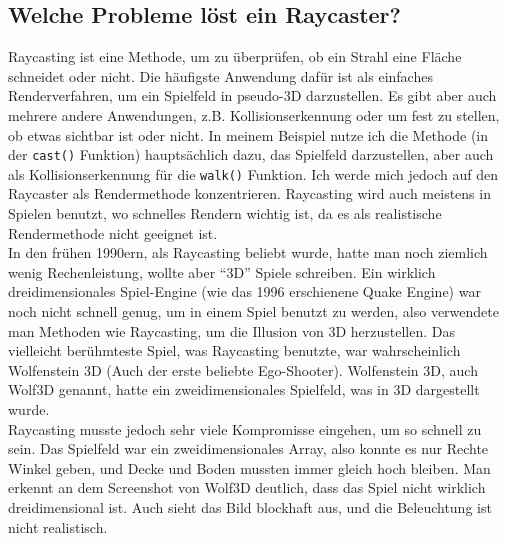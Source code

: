 \documentclass[a4paper,11pt]{report}
\begin{document}
\subsection{Welche Probleme löst ein Raycaster?}
Raycasting ist eine Methode, um zu überprüfen, ob ein Strahl eine Fläche schneidet oder nicht. Die häufigste Anwendung dafür ist als einfaches Renderverfahren, um ein Spielfeld in pseudo-3D darzustellen. Es gibt aber auch mehrere andere Anwendungen, z.B. Kollisionserkennung oder um fest zu stellen, ob etwas sichtbar ist oder nicht. In meinem Beispiel nutze ich die Methode (in der \texttt{cast()} Funktion) hauptsächlich dazu, das Spielfeld darzustellen, aber auch als Kollisionserkennung für die \texttt{walk()} Funktion. Ich werde mich jedoch auf den Raycaster als Rendermethode konzentrieren. Raycasting wird auch meistens in Spielen benutzt, wo schnelles Rendern wichtig ist, da es als realistische Rendermethode nicht geeignet ist. \\
In den frühen 1990ern, als Raycasting beliebt wurde, hatte man noch ziemlich wenig Rechenleistung, wollte aber ``3D'' Spiele schreiben. Ein wirklich dreidimensionales Spiel-Engine (wie das 1996 erschienene Quake Engine) war noch nicht schnell genug, um in einem Spiel benutzt zu werden, also verwendete man Methoden wie Raycasting, um die Illusion von 3D herzustellen. Das vielleicht berühmteste Spiel, was Raycasting benutzte, war wahrscheinlich Wolfenstein 3D (Auch der erste beliebte Ego-Shooter). Wolfenstein 3D, auch Wolf3D genannt, hatte ein zweidimensionales Spielfeld, was in 3D dargestellt wurde. \\
Raycasting musste jedoch sehr viele Kompromisse eingehen, um so schnell zu sein. Das Spielfeld war ein zweidimensionales Array, also konnte es nur Rechte Winkel geben, und Decke und Boden mussten immer gleich hoch bleiben. Man erkennt an dem Screenshot von Wolf3D deutlich, dass das Spiel nicht wirklich dreidimensional ist. Auch sieht das Bild blockhaft aus, und die Beleuchtung ist nicht realistisch.
\end{document}
